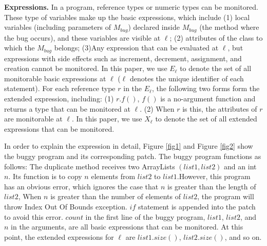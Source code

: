 \documentclass[sn-basic]{sn-jnl}
\theoremstyle{thmstyleone}
\theoremstyle{thmstyletwo}
\theoremstyle{thmstylethree}
\begin{document}
\textbf{Expressions.} In a program, reference types or numeric types can be monitored. These type of variables make up the basic expressions, which include 
(1) local variables (including parameters of $M_{bug}$) declared inside $M_{bug}$ (the method where the bug occurs), and these variables are visible at $\ell$; (2) attributes of the class to which the $M_{bug}$ belongs; (3)Any expression that can be evaluated at $\ell$, but expressions with side effects such as increment, decrement, assignment, and creation cannot be monitored. In this paper, we use $E_{\ell}$ to denote the set of all monitorable basic expressions at $\ell$ ($\ell$ denotes the unique identifier of each statement). For each reference type $r$ in the $E_{\ell}$, the following two forms form the extended expression, including: (1) $r.f()$, $f()$ is a no-argument function and returns a type that can be monitored at $\ell$. (2) When $r$ is this, the attributes of $r$ are monitorable at $\ell$. In this paper, we use $X_{\ell}$ to denote the set of all extended expressions that can be monitored.

In order to explain the expression in detail, Figure \ref{fig1} and Figure \ref{fig2} show the buggy program and its corresponding patch. The buggy program functions as follows: The duplicate method receives two ArrayLists $(list1,list2)$ and an int $n$. Its function is to copy $n$ elements from $list2$ to $list1$.However, this program has an obvious error, which ignores the case that $n$ is greater than the length of $list2$, When $n$ is greater than the number of elements of $list2$, the program will throw Index Out Of Bounds exception. $if$ statement is appended into the patch to avoid this error. $count$ in the first line of the buggy program, $list1$, $list2$, and $n$ in the arguments, are all basic expressions that can be monitored. At this point, the extended expressions for $\ell$ are $list1.size()$, $list2.size()$, and so on.
\end{document}
